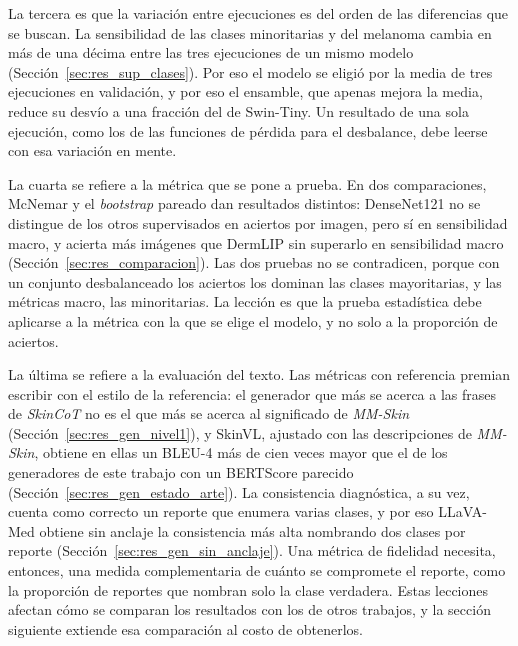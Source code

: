 La tercera es que la variación entre ejecuciones es del orden de las diferencias que se buscan. La sensibilidad de las
clases minoritarias y del melanoma cambia en más de una décima entre las tres ejecuciones de un mismo modelo
(Sección~\ref{sec:res_sup_clases}). Por eso el modelo se eligió por la media de tres ejecuciones en validación, y por
eso el ensamble, que apenas mejora la media, reduce su desvío a una fracción del de Swin-Tiny. Un resultado de una sola
ejecución, como los de las funciones de pérdida para el desbalance, debe leerse con esa variación en mente.

La cuarta se refiere a la métrica que se pone a prueba. En dos comparaciones, McNemar y el \emph{bootstrap} pareado
dan resultados distintos: DenseNet121 no se distingue de los otros supervisados en aciertos por imagen, pero sí en
sensibilidad macro, y acierta más imágenes que DermLIP sin superarlo en sensibilidad macro
(Sección~\ref{sec:res_comparacion}). Las dos pruebas no se contradicen, porque con un conjunto desbalanceado los
aciertos los dominan las clases mayoritarias, y las métricas macro, las minoritarias. La lección es que la prueba
estadística debe aplicarse a la métrica con la que se elige el modelo, y no solo a la proporción de aciertos.

La última se refiere a la evaluación del texto. Las métricas con referencia premian escribir con el estilo de la
referencia: el generador que más se acerca a las frases de \emph{SkinCoT} no es el que más se acerca al significado de
\emph{MM-Skin} (Sección~\ref{sec:res_gen_nivel1}), y SkinVL, ajustado con las descripciones de \emph{MM-Skin}, obtiene
en ellas un BLEU-4 más de cien veces mayor que el de los generadores de este trabajo con un BERTScore parecido
(Sección~\ref{sec:res_gen_estado_arte}). La consistencia diagnóstica, a su vez, cuenta como correcto un reporte que
enumera varias clases, y por eso LLaVA-Med obtiene sin anclaje la consistencia más alta nombrando dos clases por
reporte (Sección~\ref{sec:res_gen_sin_anclaje}). Una métrica de fidelidad necesita, entonces, una medida complementaria
de cuánto se compromete el reporte, como la proporción de reportes que nombran solo la clase verdadera. Estas
lecciones afectan cómo se comparan los resultados con los de otros trabajos, y la sección siguiente extiende esa
comparación al costo de obtenerlos.
